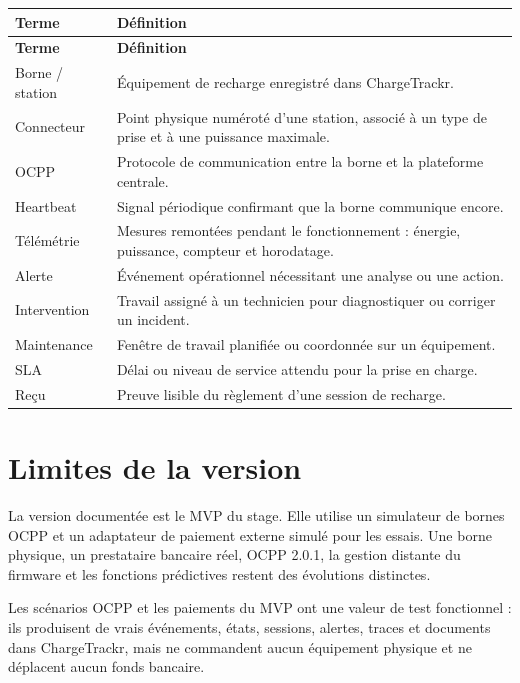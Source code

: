 \begin{longtable}{|L{3.3cm}|L{12.2cm}|}
  \hline
  \textbf{Terme} & \textbf{Définition} \\ \hline
  \endfirsthead
  \hline
  \textbf{Terme} & \textbf{Définition} \\ \hline
  \endhead
  Borne / station & Équipement de recharge enregistré dans ChargeTrackr. \\ \hline
  Connecteur & Point physique numéroté d'une station, associé à un type de prise
  et à une puissance maximale. \\ \hline
  OCPP & Protocole de communication entre la borne et la plateforme centrale. \\ \hline
  Heartbeat & Signal périodique confirmant que la borne communique encore. \\ \hline
  Télémétrie & Mesures remontées pendant le fonctionnement : énergie, puissance,
  compteur et horodatage. \\ \hline
  Alerte & Événement opérationnel nécessitant une analyse ou une action. \\ \hline
  Intervention & Travail assigné à un technicien pour diagnostiquer ou corriger
  un incident. \\ \hline
  Maintenance & Fenêtre de travail planifiée ou coordonnée sur un équipement. \\ \hline
  SLA & Délai ou niveau de service attendu pour la prise en charge. \\ \hline
  Reçu & Preuve lisible du règlement d'une session de recharge. \\ \hline
\end{longtable}

\section{Limites de la version}

La version documentée est le MVP du stage. Elle utilise un simulateur de bornes
OCPP et un adaptateur de paiement externe simulé pour les essais. Une borne
physique, un prestataire bancaire réel, OCPP 2.0.1, la gestion distante du
firmware et les fonctions prédictives restent des évolutions distinctes.

Les scénarios OCPP et les paiements du MVP ont une valeur de test fonctionnel :
ils produisent de vrais événements, états, sessions, alertes, traces et documents
dans ChargeTrackr, mais ne commandent aucun équipement physique et ne déplacent
aucun fonds bancaire.
